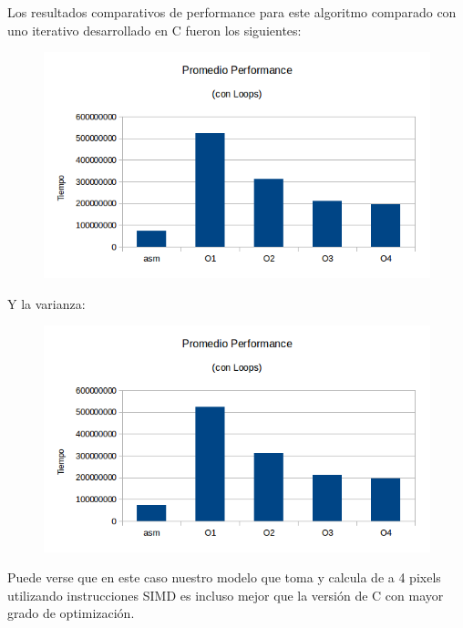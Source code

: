 \documentclass[a4paper]{article}
\begin{document}
Los resultados comparativos de performance para este algoritmo comparado con uno iterativo desarrollado en C fueron los siguientes:

\begin{figure}[h!]
  \begin{center}
  \includegraphics[scale=0.66]{Graficos1.4/sie/PSO.png}
  \label{nombreparareferenciar7}
  \end{center}
\end{figure}

\newpage

Y la varianza:

\begin{figure}[h!]
  \begin{center}
  \includegraphics[scale=0.66]{Graficos1.4/sie/PSO.png}
  \label{nombreparareferenciar8}
  \end{center}
\end{figure}

Puede verse que en este caso nuestro modelo que toma y calcula de a 4 pixels utilizando instrucciones SIMD es incluso mejor que la versión de C con mayor grado de optimización.
\end{document}
